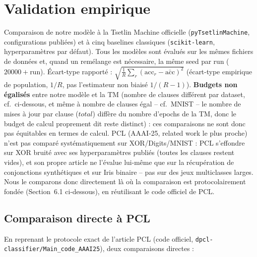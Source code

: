 \documentclass[12pt,a4paper]{article}
\begin{document}
\section{Validation empirique}

Comparaison de notre modèle à la Tsetlin Machine officielle
(\texttt{pyTsetlinMachine}, configurations publiées) et à cinq baselines
classiques (\texttt{scikit-learn}, hyperparamètres par défaut). Tous les
modèles sont évalués sur les mêmes fichiers de données et, quand un
remélange est nécessaire, la même seed par run ($20000+\text{run}$).
Écart-type rapporté : $\sqrt{\frac1R\sum_r(\mathrm{acc}_r-\bar{\mathrm{acc}})^2}$
(écart-type empirique de population, $1/R$, pas l'estimateur non biaisé
$1/(R{-}1)$). \textbf{Budgets non égalisés} entre notre modèle et la TM
(nombre de clauses différent par dataset, cf.\ ci-dessous, et même à nombre
de clauses égal -- cf.\ MNIST -- le nombre de mises à jour par clause
($total$) diffère du nombre d'epochs de la TM, donc le budget de calcul
proprement dit reste distinct) : ces comparaisons ne sont donc pas
équitables en termes de calcul. PCL (AAAI-25, related work le plus proche)
n'est pas comparé systématiquement sur XOR/Digits/MNIST : PCL s'effondre
sur XOR bruité avec ses hyperparamètres publiés (toutes les clauses restent
vides), et son propre article ne l'évalue lui-même que sur la récupération
de conjonctions synthétiques et sur Iris binaire -- pas sur des jeux
multiclasses larges. Nous le comparons donc directement là où la
comparaison est protocolairement fondée (Section~6.1 ci-dessous), en
réutilisant le code officiel de PCL.

\subsection{Comparaison directe à PCL}

En reprenant le protocole exact de l'article PCL (code officiel,
\texttt{dpcl-classifier/Main\_code\_AAAI25}), deux comparaisons directes :
\end{document}
